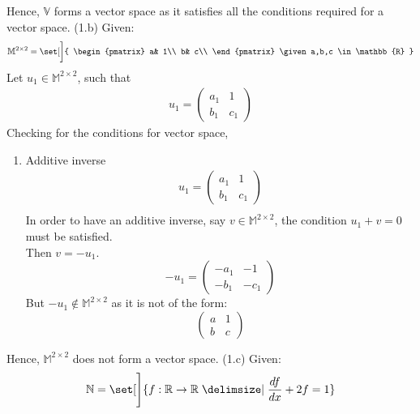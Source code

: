 \documentclass[12pt,letterpaper,fleqn]{article}
\theoremstyle{definition}
\begin{document}
Hence, $\mathbb{V}$ forms a vector space as it satisfies all the conditions required for a vector space.
\newpage
(1.b) Given:
 \begin{align}
\mathbb{M}^{2\times2} = \set[\bigg]{
\begin{pmatrix}
a& 1\\
b& c\\
\end{pmatrix}
\given a,b,c \in \mathbb{R}
} 
\end{align}
Let $u_1 \in \mathbb{M}^{2 \times 2}$, such that
\begin{equation*}
\begin{split}
u_1 = \begin{pmatrix}
a_1 &1\\
b_1 &c_1
\end{pmatrix}
\end{split}
\end{equation*}
Checking for the conditions for vector space,
\begin{enumerate}
\item Additive inverse
\begin{equation*}
\begin{split}
u_1 = \begin{pmatrix}
a_1 &1\\
b_1 &c_1
\end{pmatrix}\\
\end{split}
\end{equation*}
In order to have an additive inverse, say $v \in \mathbb{M}^{2 \times 2}$, the condition $ u_1 + v = 0$ must be satisfied.\\
Then $v = -u_1$.
\begin{equation*}
-u_1 = 
\begin{pmatrix}
-a_1 &-1\\
-b_1 &-c_1
\end{pmatrix}
\end{equation*}
But $-u_1 \notin \mathbb{M}^{2 \times 2}$ as it is not of the form:
\begin{equation*}
\begin{pmatrix}
a &1\\
b &c
\end{pmatrix}
\end{equation*}
\end{enumerate}
Hence, $\mathbb{M}^{2 \times 2}$ does not form a vector space.
\newpage
 (1.c) Given:
 \begin{align*}
 \mathbb{N} = \set[\Bigg]{f: \mathbb{R} \rightarrow \mathbb{R} \given \frac{df}{dx} + 2f = 1}
 \end{align*}
 
\end{document}
